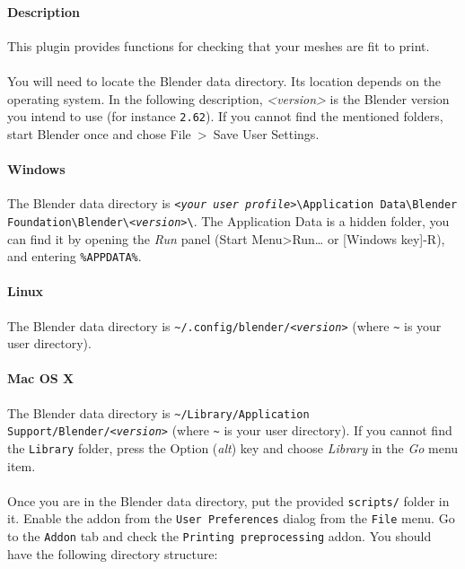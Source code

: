 \documentclass{article}
\begin{document}
	\paragraph{Description} This plugin provides functions for checking that your meshes are fit to print.

	\paragraph{}
	You will need to locate the Blender data directory. Its location depends on
	the operating system. In the following description, \emph{<version>} is the
	Blender version you intend to use (for instance \texttt{2.62}). If you cannot find the mentioned folders, start Blender once and chose File~>~Save User Settings.

	\paragraph{Windows} The Blender data directory is \texttt{\emph{<your user profile>}\textbackslash{}Application Data\textbackslash{}Blender Foundation\textbackslash{}Blender\textbackslash{}\emph{<version>}\textbackslash{}}. The Application Data is a hidden folder, you can find it by opening the \emph{Run} panel (Start Menu>Run… or [Windows key]-R), and entering \texttt{\%APPDATA\%}. 

	\paragraph{Linux} The Blender data directory is \texttt{\~ {}/.config/blender/\emph{<version>}} (where \texttt{\~{}} is your user directory).
	
	\paragraph{Mac OS X} The Blender data directory is \texttt{\~{}/Library/Application Support/Blender/\emph{<version>}} (where \texttt{\~{}} is your user directory). If you cannot find the \texttt{Library} folder, press the Option (\emph{alt}) key and choose \emph{Library} in the \emph{Go} menu item.
	
	\paragraph{} Once you are in the Blender data directory, put the provided \texttt{scripts/} folder in it. 
    Enable the addon from the \texttt{User Preferences} dialog from the \texttt{File} menu. Go to the \texttt{Addon} tab and check the \texttt{Printing preprocessing} addon.
    You should have the following directory structure:\\
\end{document}
